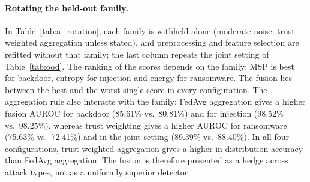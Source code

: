 \documentclass[pdflatex,sn-mathphys-num]{sn-jnl}
\begin{document}
{{{{{\paragraph{Rotating the held-out family.} In Table~\ref{tab:a_rotation}, each family is withheld alone (moderate noise; trust-weighted aggregation unless stated), and preprocessing and feature selection are refitted without that family; the last column repeats the joint setting of Table~\ref{tab:ood}. The ranking of the scores depends on the family: MSP is best for backdoor, entropy for injection and energy for ransomware. The fusion lies between the best and the worst single score in every configuration. The aggregation rule also interacts with the family: FedAvg aggregation gives a higher fusion AUROC for backdoor (85.61\% vs.\ 80.81\%) and for injection (98.52\% vs.\ 98.25\%), whereas trust weighting gives a higher AUROC for ransomware (75.63\% vs.\ 72.41\%) and in the joint setting (89.39\% vs.\ 88.40\%). In all four configurations, trust-weighted aggregation gives a higher in-distribution accuracy than FedAvg aggregation. The fusion is therefore presented as a hedge across attack types, not as a uniformly superior detector.

\begin{table}[!htbp]\centering
\caption{Rotating the held-out family: AUROC (\%) with FPR@95 (\%) in parentheses (mean over ten seeds).}\label{tab:a_rotation}
\footnotesize
\setlength{\tabcolsep}{4pt}
\end{table}

}}}}}
\end{document}
